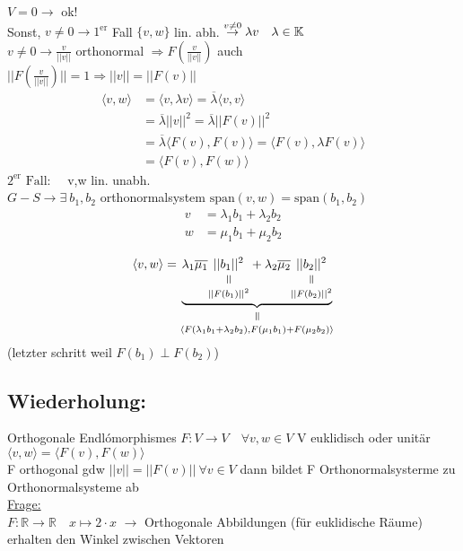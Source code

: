 \documentclass[titlepage,12pt,a4paper,ngerman]{report}
\newcommand{\verteq}{\rotatebox{90}{$\,=$}}
\newcommand{\equalto}[2]{\underset{\scriptstyle\overset{\mkern4mu\verteq}{#2}}{#1}}
\newcommand{\tx}[1]{\textrm{#1}}
\newcommand{\ub}[1]{\underbrace{#1}}
\newcommand{\spa}{\tx{span}}
\newcommand{\ska}[2]{\langle #1 , #2 \rangle}
\begin{document}
$ V = 0 \rightarrow $ ok!\\
Sonst, $ v \neq 0 \rightarrow 1^{\tx{er}} $ Fall $ \{v,w\} $ lin. abh. $ \buildrel v \neq 0 \over \rightarrow \lambda v \quad \lambda \in \mathbb{K} $ \\
$ v \neq 0 \rightarrow \frac{v}{||v||} $ orthonormal $ \Rightarrow F(\frac{v}{||v||}) $ auch\\
$ || F(\frac{v}{||v||})|| = 1 \Rightarrow ||v|| = ||F(v)||$
\begin{align*}
\ska{v}{w} &= \ska{v}{\lambda v} = \overline{\lambda} \ska{v}{v}\\
&= \overline{\lambda} ||v||^2 = \overline{\lambda} ||F(v)||^2\\ 
&= \overline{\lambda} \ska{F(v)}{F(v)} = \ska{F(v)}{\lambda F(v)}\\
&= \ska{F(v)}{F(w)}
\end{align*}
$\boxed{2^{\tx{er}} \tx{ Fall:}} \quad $  v,w lin. unabh.\\[5pt]
$ G - S \rightarrow \exists \ b_1, b_2 $ orthonormalsystem $ \spa(v,w) = \spa(b_1, b_2) $
\begin{align*}
v &= \lambda_1 b_1 + \lambda_2 b_2\\
w &= \mu_1 b_1 + \mu_2 b_2
\end{align*}

\begin{equation*}
\ska{v}{w} = \equalto{\ub{ \lambda_1 \overline{\mu_1} \equalto{||b_1||^2}{||F(b_1)||^2} + \lambda_2 \overline{\mu_2} \equalto{||b_2||^2}{||F(b_2)||^2}} }{\begin{Huge} \ska{F(\lambda_1 b_1 + \lambda_2 b_2)}{F(\mu_1 b_1 ) + F(\mu_2 b_2)} \end{Huge}}
\end{equation*}
(letzter schritt weil $ F(b_1) \perp F(b_2) $) 


\subsection{Wiederholung:}
Orthogonale Endlómorphismes $ F: V \to V \quad \forall v,w \in V$ V euklidisch oder unitär \\
$ \ska{v}{w} = \ska{F(v)}{F(w)} $\\
F orthogonal gdw $ ||v|| = ||F(v) || \  \forall v \in V $ dann bildet F Orthonormalsysterme zu Orthonormalsysteme ab \\
\underline{Frage:}\\
$ F: \mathbb{R} \to \mathbb{R}\quad x \mapsto 2 \cdot x $
$ \rightarrow $ Orthogonale Abbildungen (für euklidische Räume) erhalten den Winkel zwischen Vektoren
\end{document}
